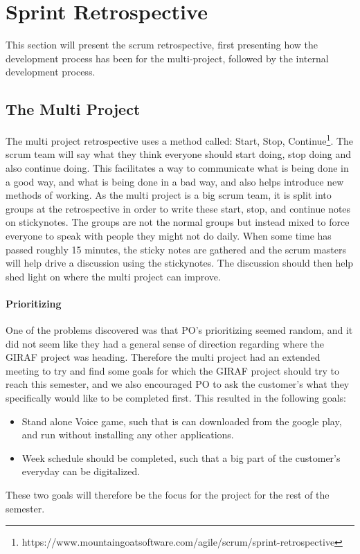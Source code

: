 \section{Sprint Retrospective}

This section will present the scrum retrospective, first presenting how the development process has been for the multi-project, followed by the internal development process.

\subsection*{The Multi Project}

The multi project retrospective uses a method called: Start, Stop, Continue\footnote{https://www.mountaingoatsoftware.com/agile/scrum/sprint-retrospective}.
The scrum team will say what they think everyone should start doing, stop doing and also continue doing. 
This facilitates a way to communicate what is being done in a good way, and what is being done in a bad way, and also helps introduce new methods of working.
As the multi project is a big scrum team, it is split into groups at the retrospective in order to write these start, stop, and continue notes on stickynotes.
The groups are not the normal groups but instead mixed to force everyone to speak with people they might not do daily.
When some time has passed roughly 15 minutes, the sticky notes are gathered and the scrum masters will help drive a discussion using the stickynotes.
The discussion should then help shed light on where the multi project can improve.

\paragraph{Prioritizing} One of the problems discovered was that PO's prioritizing seemed random, and it did not seem like they had a general sense of direction regarding where the GIRAF project was heading.
Therefore the multi project had an extended meeting to try and find some goals for which the GIRAF project should try to reach this semester, and we also encouraged PO to ask the customer's what they specifically would like to be completed first.
This resulted in the following goals:
\begin{itemize}
	\item Stand alone Voice game, such that is can downloaded from the google play, and run without installing any other applications.
	\item Week schedule should be completed, such that a big part of the customer's everyday can be digitalized.
\end{itemize}
These two goals will therefore be the focus for the project for the rest of the semester.

